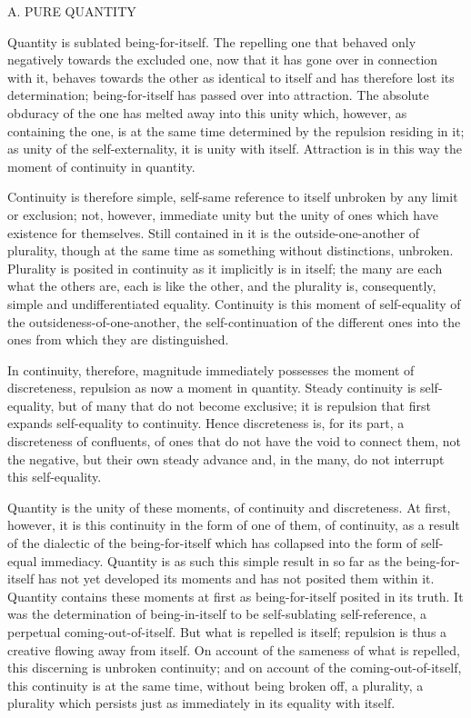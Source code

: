 A. PURE QUANTITY

Quantity is sublated being-for-itself.
The repelling one that behaved only
negatively towards the excluded one,
now that it has gone over in connection with it,
behaves towards the other as identical to itself
and has therefore lost its determination;
being-for-itself has passed over into attraction.
The absolute obduracy of the one has melted away
into this unity which, however, as containing the one, is
at the same time determined by the repulsion residing in it;
as unity of the self-externality, it is unity with itself.
Attraction is in this way the moment of continuity in quantity.

Continuity is therefore simple, self-same reference to itself
unbroken by any limit or exclusion;
not, however, immediate unity but the unity of ones
which have existence for themselves.
Still contained in it is the outside-one-another of plurality,
though at the same time as something without distinctions, unbroken.
Plurality is posited in continuity as it implicitly is in itself;
the many are each what the others are,
each is like the other,
and the plurality is, consequently,
simple and undifferentiated equality.
Continuity is this moment of self-equality
of the outsideness-of-one-another,
the self-continuation of the different ones
into the ones from which they are distinguished.

In continuity, therefore, magnitude immediately possesses
the moment of discreteness, repulsion as now a moment in quantity.
Steady continuity is self-equality,
but of many that do not become exclusive;
it is repulsion that first expands self-equality to continuity.
Hence discreteness is, for its part, a discreteness of confluents,
of ones that do not have the void to connect them,
not the negative, but their own steady advance
and, in the many, do not interrupt this self-equality.

Quantity is the unity of these moments,
of continuity and discreteness.
At first, however, it is this continuity
in the form of one of them, of continuity,
as a result of the dialectic of the being-for-itself
which has collapsed into the form of self-equal immediacy.
Quantity is as such this simple result
in so far as the being-for-itself has
not yet developed its moments
and has not posited them within it.
Quantity contains these moments at first
as being-for-itself posited in its truth.
It was the determination of being-in-itself
to be self-sublating self-reference,
a perpetual coming-out-of-itself.
But what is repelled is itself;
repulsion is thus a creative flowing away from itself.
On account of the sameness of what is repelled,
this discerning is unbroken continuity;
and on account of the coming-out-of-itself,
this continuity is at the same time,
without being broken off, a plurality,
a plurality which persists just as
immediately in its equality with itself.

